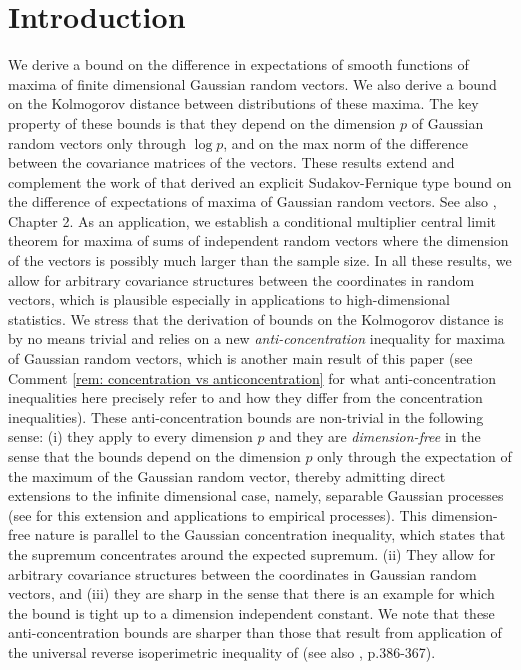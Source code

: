 \documentclass[11pt,reqno]{amsart}
\theoremstyle{definition}
\begin{document}
\maketitle



\maketitle

\section{Introduction}

We derive a bound on the difference in expectations of smooth functions of maxima of finite dimensional Gaussian random vectors.
We also derive a bound on  the Kolmogorov distance between distributions of
these maxima.   The key property of these bounds is that they depend on the dimension $p$ of Gaussian random vectors only through $\log p$, and on the max norm of the difference between the covariance matrices of the vectors.  These results  extend and complement the work of \cite{Chatterjee2005b} that derived an explicit Sudakov-Fernique type bound on the difference of expectations of maxima of Gaussian random vectors. See also \cite{AdlerTaylor2007}, Chapter 2.  As an application, we establish a conditional  multiplier central limit theorem for maxima of sums of independent random vectors where the dimension of the vectors is  possibly much larger than the sample size. In all these results, we allow for arbitrary covariance structures between the coordinates in random vectors, which is plausible especially in applications to high-dimensional statistics. We stress that  the derivation of bounds on the Kolmogorov distance is by no means trivial and  relies on a new {\em anti-concentration} inequality for maxima of Gaussian random vectors,
which is  another main result of  this paper (see Comment \ref{rem: concentration vs anticoncentration} for what anti-concentration inequalities here precisely refer to and how they differ from the concentration inequalities).
These anti-concentration bounds are non-trivial in the following sense: (i) they apply to every dimension $p$ and they are {\em dimension-free} in the sense that the bounds depend on the dimension $p$ only through the expectation of the maximum of the Gaussian random vector, thereby admitting direct extensions to the infinite dimensional case, namely, separable Gaussian processes (see \cite{CCK13} for this extension and applications to empirical processes).  This dimension-free nature is parallel to the Gaussian concentration inequality, which states that the supremum concentrates around the expected supremum. (ii) They allow for arbitrary covariance structures between the coordinates in Gaussian random vectors, and (iii) they are sharp in the sense that there is an example for which the bound is tight up to a dimension independent constant. We note that these anti-concentration bounds are sharper than those that result from application of the universal reverse isoperimetric inequality of \cite{Ball1993} (see also \cite{Bentkus2003}, p.386-367).
\end{document}
